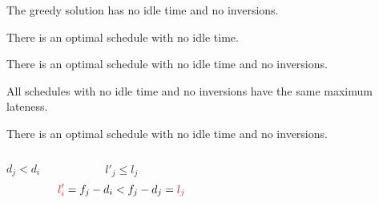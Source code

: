 \begin{frame}{}
  \begin{theorem}
    The greedy solution has no idle time and no inversions.
  \end{theorem}

  \pause
  \vspace{0.30cm}
  \begin{theorem}
    There is an optimal schedule with no idle time.
  \end{theorem}

  \pause
  \begin{theorem}
    There is an optimal schedule with no idle time and no inversions.
  \end{theorem}
  \pause
  \centerline{\it {}}

  \pause
  \vspace{0.10cm}
  \begin{theorem}
    All schedules with no idle time and no inversions have the same maximum lateness.
  \end{theorem}
\end{frame}

\begin{frame}{}
  \begin{theorem}
    There is an optimal schedule with no idle time and no inversions.
  \end{theorem}

  \pause
  \vspace{0.50cm}
  \begin{quote}
    \centering
  \end{quote}

  \pause
  \vspace{0.50cm}
  \begin{columns}
      \pause
      \[
	d_j < d_i
      \]

      \pause
      \[
	l'_j \le l_j
      \]
      \pause
      \[
	\textcolor{red}{l'_i} = f_j - d_i < f_j - d_j = \textcolor{red}{l_j}
      \]
  \end{columns}
\end{frame}
